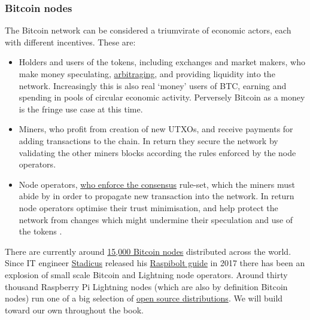 \subsubsection{Bitcoin nodes }
The Bitcoin network can be considered a triumvirate of economic actors, each with different incentives. These are:
\begin{itemize}
\item Holders and users of the tokens, including exchanges and market makers, who make money speculating, \href{https://en.wikipedia.org/wiki/Arbitrage}{arbitraging}, and providing liquidity into the network. Increasingly this is also real `money' users of BTC, earning and spending in pools of circular economic activity. Perversely Bitcoin as a money is the fringe use case at this time.
\item Miners, who profit from creation of new UTXOs, and receive payments for adding transactions to the chain. In return they secure the network by validating the other miners blocks according the rules enforced by the node operators.
\item Node operators, \href{https://www.truthcoin.info/blog/measuring-decentralization/}{who enforce the consensus} rule-set, which the miners must abide by in order to propagate new transaction into the network. In return node operators optimise their trust minimisation, and help protect the network from changes which might undermine their speculation and use of the tokens \cite{blocksizewars}.
\end{itemize}
There are currently around \href{https://bitnodes.io/}{15,000 Bitcoin nodes} distributed across the world. 
Since IT engineer \href{https://stadicus.com/}{Stadicus} released his \href{https://raspibolt.org/backstory.html}{Raspibolt guide} in 2017 there has been an explosion of small scale Bitcoin and Lightning node operators. 
Around thirty thousand Raspberry Pi Lightning nodes (which are also by definition Bitcoin nodes) run one of a big selection of \href{https://github.com/bavarianledger/bitcoin-nodes}{open source distributions}. We will build toward our own throughout the book.
